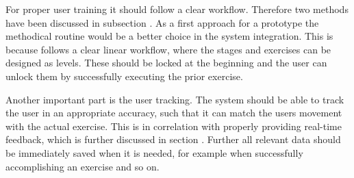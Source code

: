 For proper user training it should follow a clear workflow. Therefore two methods have been discussed in subsection \textit{}. As a first approach for a prototype the methodical routine would be a better choice in the system integration. This is because follows a clear linear workflow, where the stages and exercises can be designed as levels. These should be locked at the beginning and the user can unlock them by successfully executing the prior exercise.

Another important part is the user tracking. The system should be able to track the user in an appropriate accuracy, such that it can match the users movement with the actual exercise. This is in correlation with properly providing real-time feedback, which is further discussed in section \textit{}. Further all relevant data should be immediately saved when it is needed, for example when successfully accomplishing an exercise and so on.

\begin{comment}
- System should be able to track user appropriately
- All relevant data should be immediately saved when it is needed (unlocking exercise/stage, failing/accomplish exercise)
- Information about where the user currently is should be given --> title
- User selection
- Also a possibility to go to the last screen if she misclicks should be given.
\end{comment}